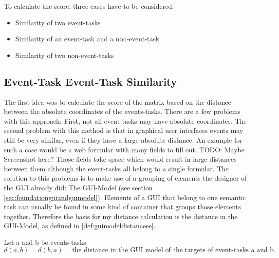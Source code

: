 To calculate the score, three cases have to be considered:
\begin{itemize}
	\item Similarity of two event-tasks
	\item Similarity of an event-task and a non-event-task
	\item Similarity of two non-event-tasks
\end{itemize}

\subsection{Event-Task Event-Task Similarity}
The first idea was to calculate the score of the matrix based on the distance between the absolute coordinates of the events-tasks. 
There are a few problems with this approach: First, not all event-tasks may have absolute coordinates. 
The second problem with this method is that in graphical user interfaces events may still be very similar, even if they have a large absolute distance.
An example for such a case would be a web formular with many fields to fill out. 
TODO: Maybe Screenshot here?
Those fields take space which would result in large distances between them although the event-tasks all belong to a single formular.
The solution to this problems is to make use of a grouping of elements the designer of the GUI already did: The GUI-Model (see section \ref{sec:foundationguiandguimodel}).
Elements of a GUI that belong to one semantic task can usually be found in some kind of container that groups those elements together. Therefore the basis for my 
distance calculation is the distance in the GUI-Model, as defined in \ref{def:guimodeldistanceee}. 

\begin{definition}
	\item Let a and b be events-tasks
\begin{equation*}d(a,b) = d(b,a) = \text{the distance in the GUI model of the targets of event-tasks a and b.}
\end{equation*}
\label{def:guimodeldistanceee}
\end{definition}

